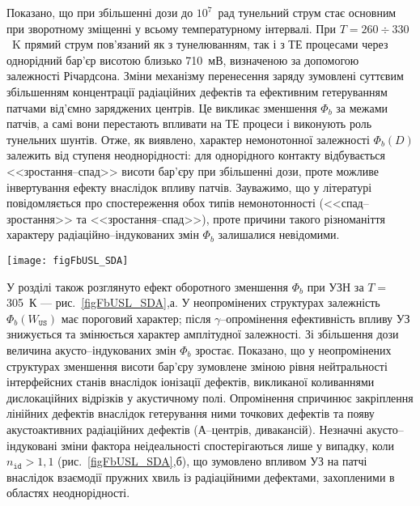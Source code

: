 Показано, що
при збільшенні дози до $10^7$~рад тунельний струм стає основним
при зворотному зміщенні у всьому температурному інтервалі.
При $T=260\div330$~K прямий струм пов'язаний як з тунелюванням, так і з ТЕ процесами через однорідний бар'єр
висотою близько 710~мВ, визначеною за допомогою залежності Річардсона.
Зміни механізму перенесення заряду зумовлені суттєвим збільшенням концентрації радіаційних дефектів
та ефективним гетеруванням патчами від'ємно заряджених центрів.
Це викликає  зменшення $\Phi_b$ за межами патчів, а самі вони перестають впливати на ТЕ процеси
і виконують роль тунельних шунтів.
Отже, як виявлено, характер немонотонної залежності $\Phi_b(D)$ залежить від ступеня неоднорідності:
для однорідного контакту відбувається <<зростання--спад>> висоти бар'єру при збільшенні дози, проте
можливе інвертування ефекту внаслідок впливу патчів.
Зауважимо, що у літературі повідомляється про спостереження обох типів немонотонності (<<спад--зростання>>
та <<зростання--спад>>),
проте причини такого різноманіття характеру радіаційно--індукованих змін $\Phi_b$ залишалися невідомими.

\begin{SCfigure}
\texttt{[image: figFbUSL\_SDA]}
\caption{\label{figFbUSL_SDA}
Залежності висоти бар'єру Шотткі (а) та фактора неідеальності (б)  від інтенсивності УЗ для
структур Al---$n$--$n^+$--Si з різною дозою $\gamma$--опромінення.
Горизонтальні пунктирні лінії відповідають значенням параметрів, виміряних без УЗН.
\mbox{$T=305$~K.}
$f_\mathtt{US}=9,6$~МГц
}%
\end{SCfigure}

У розділі також розглянуто ефект оборотного зменшення $\Phi_b$ при
УЗН за $T\!=$305~К --- рис.~\ref{figFbUSL_SDA},а.
У неопромінених структурах залежність $\Phi_b(W_\mathtt{US})$ має пороговий характер;
після $\gamma$--опромінення ефективність впливу УЗ знижується та змінюється характер амплітудної залежності.
Зі збільшення дози величина акусто--індукованих змін $\Phi_b$ зростає.
Показано, що у неопромінених структурах зменшення висоти бар'єру зумовлене зміною рівня нейтральності інтерфейсних станів
внаслідок іонізації дефектів, викликаної коливаннями дислокаційних відрізків у акустичному полі.
Опромінення спричинює закріплення лінійних дефектів внаслідок гетерування ними точкових дефектів та
появу акустоактивних радіаційних дефектів (А--центрів, дивакансій).
Незначні акусто--індуковані зміни фактора неідеальності спостерігаються лише у випадку, коли $n_\mathtt{id}>1,1$ (рис.~\ref{figFbUSL_SDA},б),
що зумовлено впливом УЗ на патчі внаслідок взаємодії пружних хвиль із радіаційними дефектами, захопленими в областях неоднорідності.

